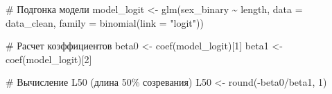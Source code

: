 \documentclass[
  letterpaper,
  DIV=11,
  numbers=noendperiod]{scrreprt}
\newenvironment{Shaded}{\begin{snugshade}}{\end{snugshade}}
\newcommand{\AttributeTok}[1]{\textcolor[rgb]{0.40,0.45,0.13}{#1}}
\newcommand{\CommentTok}[1]{\textcolor[rgb]{0.37,0.37,0.37}{#1}}
\newcommand{\DecValTok}[1]{\textcolor[rgb]{0.68,0.00,0.00}{#1}}
\newcommand{\FunctionTok}[1]{\textcolor[rgb]{0.28,0.35,0.67}{#1}}
\newcommand{\NormalTok}[1]{\textcolor[rgb]{0.00,0.23,0.31}{#1}}
\newcommand{\OtherTok}[1]{\textcolor[rgb]{0.00,0.23,0.31}{#1}}
\newcommand{\SpecialCharTok}[1]{\textcolor[rgb]{0.37,0.37,0.37}{#1}}
\newcommand{\StringTok}[1]{\textcolor[rgb]{0.13,0.47,0.30}{#1}}
\begin{document}
\begin{Shaded}
\begin{Highlighting}[]
\CommentTok{\# Подгонка модели}
\NormalTok{model\_logit }\OtherTok{\textless{}{-}} \FunctionTok{glm}\NormalTok{(sex\_binary }\SpecialCharTok{\textasciitilde{}}\NormalTok{ length, }
                   \AttributeTok{data =}\NormalTok{ data\_clean, }
                   \AttributeTok{family =} \FunctionTok{binomial}\NormalTok{(}\AttributeTok{link =} \StringTok{"logit"}\NormalTok{))}

\CommentTok{\# Расчет коэффициентов}
\NormalTok{beta0 }\OtherTok{\textless{}{-}} \FunctionTok{coef}\NormalTok{(model\_logit)[}\DecValTok{1}\NormalTok{]}
\NormalTok{beta1 }\OtherTok{\textless{}{-}} \FunctionTok{coef}\NormalTok{(model\_logit)[}\DecValTok{2}\NormalTok{]}

\CommentTok{\# Вычисление L50 (длина 50\% созревания)}
\NormalTok{L50 }\OtherTok{\textless{}{-}} \FunctionTok{round}\NormalTok{(}\SpecialCharTok{{-}}\NormalTok{beta0}\SpecialCharTok{/}\NormalTok{beta1, }\DecValTok{1}\NormalTok{)}


\end{Highlighting}
\end{Shaded}
\end{document}
